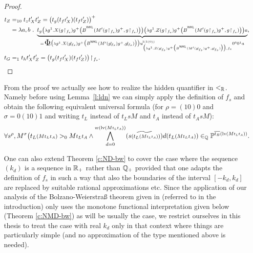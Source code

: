 \begin{proof}
\begin{align*}
t_Z&=_{10} t_zt_{X}'t_{Z}'
	  =\big(t_g(t_f\args t_X')(t_f\args t_Z')\big)^+ \\
   &=\lambda a, b\ .\ \underbrace { t_g\args{
    	\big( \args \lambda g^1 . X     		
	(g\!\restriction\!{_{f_s}})
    	g^+
    	\big(B^{^\WKL}(M'(g\!\restriction\!{_{f_s}})g^+,g\!\restriction\!{_{f_s}})\big)	 \big)
    	\big( \args \lambda g^1 . Z 
        (g\!\restriction\!{_{f_s}})
    	g^+
    	\big(B^{^\WKL}(M'(g\!\restriction\!{_{f_s}})g^+,g\!\restriction\!{_{f_s}})\big)	 \big)
    	a} }_{=\xTWf
    	{\big( \args \lambda g^1 . X 
        (g\!\restriction\!{_{f_s}}) g^+
    	\big(B^{^\WKL}(M'(g\!\restriction\!{_{f_s}})g^+,g\!\restriction\!{_{f_s}})\big)	 \big)}
		  {\big( \args \lambda g^1 . Z 
        (g\!\restriction\!{_{f_s}})
    	g^+ \big(B^{^\WKL}(M'(g\!\restriction\!{_{f_s}})g^+,g\!\restriction\!{_{f_s}})\big)
        \big)}{f_s}a} ,\\
t_G &=_1t_ht_{X}'t_{Z}' 
     =\big(t_g(t_f\args t_X')(t_f\args t_Z')\big)\!\restriction\!{_{f_s}} . 
\end{align*} 
\end{proof}


\begin{remark}
From the proof we actually see how to realize the hidden quantifier in 
$<_{\mathbb{R}}$. Namely before using Lemma~\ref{l:ldn} we can simply 
apply the definition of $f_s$ and obtain
the following equivalent universal formula (for $\rho=(10)0$ and $\sigma=0(10)1$ 
and writing ${t_L}$ instead of $t_LsM$ and ${t_A}$ instead of $t_AsM$):
\[
\forall s^{\rho}, M^{\sigma}
  \big( {t_L}\args{(M\args{{t_L}{t_A}})}>_0 M\args{{t_L}{t_A}}\wedge\ 
  \!\!\bigwedge_{d=0}^{w(\l(M\args{{t_L}{t_A}}))}
         (\widetilde{s\args{({t_L}\args{(M\args{{t_L}{t_A}})})}})d({t_L}\args{(M\args{{t_L}{t_A}})})
         \in_\QQ \PP^{\overline{t_B}(\l(M\args{t_Lt_A}))}
\text{.}
\]
\end{remark}
\begin{remark} 
One can also extend Theorem \ref{c:ND-bw} to cover the case where the 
sequence $(k_d)$ is a sequence in $\mathbb{R}_+$ rather than $\mathbb{Q}_+$ provided that 
one adapts the definition of $f_s$ in such a way that also the boundaries 
of the interval $[-k_d,k_d]$ are replaced by suitable rational 
approximations etc. Since the application of our analysis of the 
Bolzano-Weierstra\ss{} theorem given in \cite{Kohlenbach2011} (referred 
to in the introduction) only uses the monotone functional interpretation 
given below (Theorem \ref{c:NMD-bw}) as will be usually the case, 
we restrict ourselves in this thesis to treat the case with 
real $k_d$ only in that context where things are particularly simple 
(and no approximation of the type mentioned above is needed). 
\end{remark}

